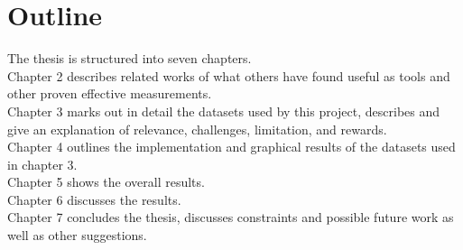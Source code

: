 \section{Outline}
The thesis is structured into seven chapters.
\newline \\Chapter 2 describes related works of what others have found useful as tools and other proven effective measurements.
\newline \\Chapter 3 marks out in detail the datasets used by this project, describes and give an explanation of relevance, challenges, limitation, and rewards.
\newline \\Chapter 4 outlines the implementation and graphical results of the datasets used in chapter 3.
\newline \\Chapter 5 shows the overall results.
\newline \\Chapter 6 discusses the results.
\newline \\Chapter 7 concludes the thesis, discusses constraints and possible future work as well as other suggestions.
